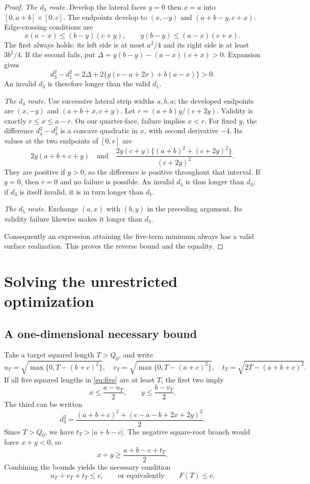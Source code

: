 \documentclass[11pt]{article}
\theoremstyle{definition}
\newcommand{\spq}[1]{\sqrt{\max\{0,#1\}}}
\newcommand{\sqzero}{Q_0}
\begin{document}
\begin{proof}
\emph{The \(d_3\) route.}
Develop the lateral faces \(y=0\) then \(x=a\) into
\([0,a+b]\times[0,c]\). The endpoints develop to
\((x,-y)\) and \((a+b-y,c+x)\). Edge-crossing conditions are
\[
x(a-x)\le(b-y)(c+y),\qquad
y(b-y)\le(a-x)(c+x).
\]
The first always holds: its left side is at most \(a^2/4\) and
its right side is at least \(3b^2/4\).
If the second fails, put
\(\Delta=y(b-y)-(a-x)(c+x)>0\). Expansion gives
\[
d_3^2-d_1^2=
2\Delta+2\{y(c-a+2x)+b(a-x)\}>0.
\]
An invalid \(d_3\) is therefore longer than the valid \(d_1\).

\emph{The \(d_4\) route.}
Use successive lateral strip widths \(a,b,a\); the developed
endpoints are \((x,-y)\) and \((a+b+x,c+y)\).
Let \(r=(a+b)y/(c+2y)\). Validity is exactly
\(r\le x\le a-r\). On our quarter-face, failure implies \(x<r\).
For fixed \(y\), the difference \(d_4^2-d_3^2\) is a concave
quadratic in \(x\), with second derivative \(-4\). Its values at
the two endpoints of \([0,r]\) are
\[
2y(a+b+c+y)
\quad\text{and}\quad
\frac{2y(c+y)\{(a+b)^2+(c+2y)^2\}}{(c+2y)^2}.
\]
They are positive if \(y>0\), so the difference is positive
throughout that interval. If \(y=0\), then \(r=0\) and no failure
is possible. An invalid \(d_4\) is thus longer than \(d_3\);
if \(d_3\) is itself invalid, it is in turn longer than \(d_1\).

\emph{The \(d_5\) route.}
Exchange \((a,x)\) with \((b,y)\) in the preceding argument.
Its validity failure likewise makes it longer than \(d_3\).

Consequently an expression attaining the five-term minimum always
has a valid surface realization. This proves the reverse bound and
the equality.
\end{proof}

\section{Solving the unrestricted optimization}
\label{sec:rootproof}

\subsection{A one-dimensional necessary bound}

Take a target squared length \(T>\sqzero\), and write
\[
u_T=\spq{T-(b+c)^2},\quad
v_T=\spq{T-(a+c)^2},\quad
t_T=\sqrt{2T-(a+b+c)^2}.
\]
If all five squared lengths in \eqref{eq:five} are at least \(T\),
the first two imply
\[
x\le\frac{a-u_T}{2},\qquad y\le\frac{b-v_T}{2}.
\]
The third can be written
\[
d_3^2=\frac{(a+b+c)^2+(c-a-b+2x+2y)^2}{2}.
\]
Since \(T>\sqzero\), we have \(t_T>|a+b-c|\).
The negative square-root branch would force \(x+y<0\), so
\[
x+y\ge\frac{a+b-c+t_T}{2}.
\]
Combining the bounds yields the necessary condition
\[
u_T+v_T+t_T\le c,\qquad\text{or equivalently}\qquad F(T)\le c.
\]
\end{document}
